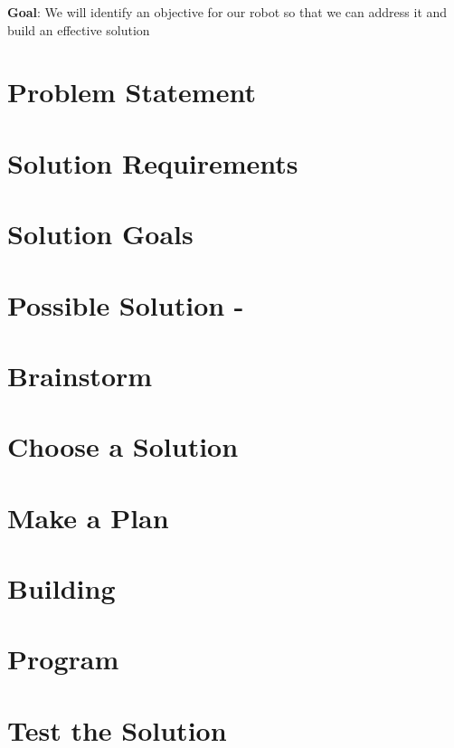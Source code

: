 \chapterauthor{}
\textbf{Goal}: We will identify an objective for our robot so that we can address it and build an effective solution
\section*{Problem Statement}
\section*{Solution Requirements}
\section*{Solution Goals}
\chapterauthor{}
\section*{Possible Solution - }
\section*{Brainstorm}
\chapterauthor{}
\section*{Choose a Solution}
\section*{Make a Plan}
\chapterauthor{}
\section*{Building}
\section*{Program}
\chapterauthor{}
\section*{Test the Solution}
